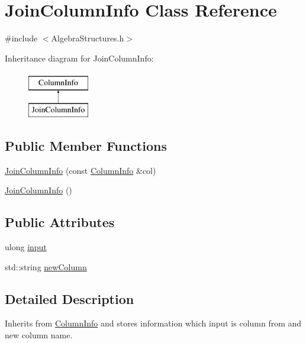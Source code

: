 \hypertarget{class_join_column_info}{\section{Join\+Column\+Info Class Reference}
\label{class_join_column_info}
}


{\ttfamily \#include $<$Algebra\+Structures.\+h$>$}

Inheritance diagram for Join\+Column\+Info\+:\begin{figure}[H]
\begin{center}
\leavevmode
\includegraphics[height=2.000000cm]{class_join_column_info}
\end{center}
\end{figure}
\subsection*{Public Member Functions}
\begin{DoxyCompactItemize}
\item 
\hyperlink{class_join_column_info_a87471f04a13b3b2a5ff4bd60065e18d9}{Join\+Column\+Info} (const \hyperlink{class_column_info}{Column\+Info} \&col)
\item 
\hyperlink{class_join_column_info_a6264c2ada06ad66c052657f00784e217}{Join\+Column\+Info} ()
\end{DoxyCompactItemize}
\subsection*{Public Attributes}
\begin{DoxyCompactItemize}
\item 
ulong \hyperlink{class_join_column_info_a6a87e51d648e21dd6806d7a1bd6191da}{input}
\item 
std\+::string \hyperlink{class_join_column_info_a4fdb28a84e69012cdb314463f9c0d674}{new\+Column}
\end{DoxyCompactItemize}


\subsection{Detailed Description}
Inherits from \hyperlink{class_column_info}{Column\+Info} and stores information which input is column from and new column name. 

